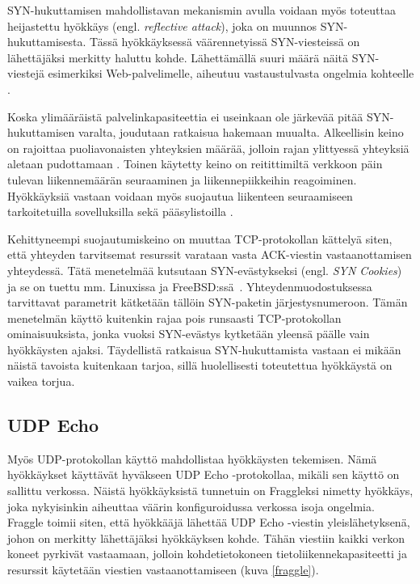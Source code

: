 SYN-hukuttamisen mahdollistavan mekanismin avulla voidaan myös toteuttaa
heijastettu hyökkäys (engl. \textit{reflective attack}), joka on muunnos 
SYN-hukuttamisesta. Tässä hyökkäyksessä väärennetyissä SYN-viesteissä on
lähettäjäksi merkitty haluttu kohde. Lähettämällä suuri määrä näitä SYN-viestejä 
esimerkiksi Web-\-palvelimelle, aiheutuu vastaustulvasta ongelmia
kohteelle \cite{STACK}.

Koska ylimääräistä palvelinkapasiteettia ei useinkaan ole järkevää
pitää SYN-\-hukuttamisen varalta, joudutaan ratkaisua
hakemaan muualta. Alkeellisin keino on rajoittaa puoliavonaisten
yhteyksien määrää, jolloin rajan ylittyessä yhteyksiä aletaan
pudottamaan \cite{TCP}. Toinen käytetty keino on reitittimiltä
verkkoon päin tulevan liikennemäärän seuraaminen ja liikennepiikkeihin
reagoiminen. Hyökkäyksiä vastaan voidaan myös suojautua liikenteen
seuraamiseen tarkoitetuilla sovelluksilla sekä pääsylistoilla
\cite{STACK}.

Kehittyneempi suojautumiskeino on muuttaa TCP-protokollan kättelyä
siten, että yhteyden tarvitsemat resurssit varataan vasta ACK-viestin
vastaanottamisen yhteydessä. Tätä menetelmää kutsutaan
SYN-evästykseksi (engl. \textit{SYN Cookies}) ja se on tuettu
mm. Linuxissa ja FreeBSD:ssä~\cite{syncookies}. Yhteydenmuodostuksessa
tarvittavat parametrit kätketään tällöin SYN-paketin
järjestysnumeroon. Tämän menetelmän käyttö kuitenkin rajaa pois
runsaasti TCP-protokollan ominaisuuksista, jonka vuoksi SYN-evästys
kytketään yleensä päälle vain hyökkäysten ajaksi.
Täydellistä ratkaisua SYN-hukuttamista vastaan ei mikään näistä
tavoista kuitenkaan tarjoa, sillä huolellisesti toteutettua hyökkäystä on
vaikea torjua.

\subsection{UDP Echo}

Myös UDP-protokollan käyttö mahdollistaa hyökkäysten tekemisen. Nämä
hyökkäykset käyttävät hyväkseen UDP Echo -protokollaa, mikäli sen
käyttö on sallittu verkossa. Näistä hyökkäyksistä tunnetuin on
Fraggleksi nimetty hyökkäys, joka nykyisinkin aiheuttaa väärin
konfiguroidussa verkossa isoja ongelmia. Fraggle toimii siten, että
hyökkääjä lähettää UDP Echo -viestin yleislähetyksenä, johon on
merkitty lähettäjäksi hyökkäyksen kohde. Tähän viestiin kaikki verkon
koneet pyrkivät vastaamaan, jolloin kohdetietokoneen
tietoliikennekapasiteetti ja resurssit käytetään viestien
vastaanottamiseen (kuva \ref{fraggle}).

